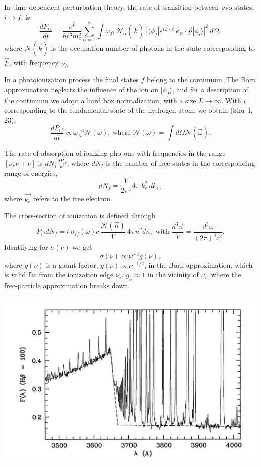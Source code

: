 \LogoOff
\bgclear
\pagecolor{white}

In time-dependent perturbation theory, the rate of transition between
two states, $i\rightarrow f $, is:
\[
\frac{dP_{if}}{dt} = \frac{e^2}{h c^3 m_e^2} \sum_{\alpha = 1}^2 \int
\omega_{fi} ~\mathcal{N}_{\alpha}(\vec{k}) ~| \langle \phi_f |
e^{i\vec{k}\cdot\vec{x} } \vec{e}_{\alpha} \cdot \vec{p} | \phi_i
\rangle |^2 ~d\Omega,
\]   
where $\mathcal{N}(\vec{k})$ is the occupation number of photons in
the state corresponding to  $\vec{k}$,
with frequency  $\nu_{fi}$.

In a photoionization process the final states $f$ belong to the
continuum. The Born approximation neglects the influence of the ion on
$|\phi_f\rangle$, and for a description of the continuum we adopt a hard
box normalization, with a size  $L \rightarrow
\infty$. With  $i$ corresponding to the fundamental state of the
hydrogen atom, we obtain (Shu~I, 23),
\[
\frac{dP_{if}}{dt} \propto \omega_{fi}^{-3} \mathcal{N}(\omega),
~\text{where } \mathcal{N}(\omega) = \int d\Omega
\mathcal{N}(\vec{\omega}) .
\]


\foilhead{}

The rate of absorption of ionizing photons with frequencies in the
range $[\nu,\nu+\nu]$ is $ dN_f \frac{dP_{if}}{dt} $, where $dN_f$ is
the number of free states in the corresponding range of energies,
\[ 
dN_f = \frac{V}{2\pi^3} 4\pi~k_e^2 ~dk_e,
\]
where $\vec{k_e}$ refers to the free electron.

The cross-section of ionization is defined through
\[
P_{if} dN_f =  t~\sigma_{if}(\omega) c ~\frac{\mathcal{N}(\vec{n})}{V}
 ~4\pi n^2 dn , \text{~with } \frac{d^3\vec{n}}{V} =
\frac{d^3\omega}{(2\pi)^3 c^3}.
\]
Identifying for $\sigma(\nu)$ we get
\[
\sigma(\nu) \propto \nu^{-3}  g(\nu),
\]
where $g(\nu)$ is a gaunt factor, $g(\nu) \propto \nu^{-1/2} $, in the
Born approximation, which is valid far from the ionization edge
$\nu_\circ$. $g_\nu \approx 1 $ in the vicinity of $\nu_\circ$, where
the free-particle approximation breaks down.


\foilhead{}

\begin{center}
  \includegraphics[width=25cm,height=!]{./C/bj_liu.jpg}
\end{center}


